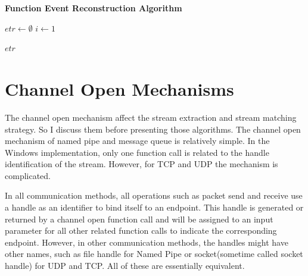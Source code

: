 \begin{algorithm}[H]
\DontPrintSemicolon
\caption{{\bf Function Event Reconstruction Algorithm} \label{eventAlg}}
$etr \leftarrow \emptyset$\; 
$i \leftarrow 1$\;

\KwRet $etr$\;
\end{algorithm} 

\section{Channel Open Mechanisms}\label{mecha}
The channel open mechanism affect the stream extraction and stream matching strategy. So I discuss them before presenting those algorithms. The channel open mechanism of named pipe and message queue is relatively simple. In the Windows implementation, only one function call is related to the handle identification of the stream. However, for TCP and UDP the mechanism is complicated.

In all communication methods, all operations such as packet send and receive use a handle as an identifier to bind itself to an endpoint. This handle is generated or returned by a channel open function call and will be assigned to an input parameter for all other related function calls to indicate the corresponding endpoint. However, in other communication methods, the handles might have other names, such as file handle for Named Pipe or socket(sometime called socket handle) for UDP and TCP. All of these are essentially equivalent.

